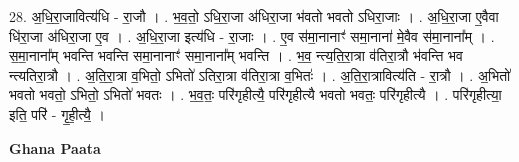 \documentclass[17pt]{extarticle}
\begin{document}
28. अ॒धि॒रा॒जावित्य॑धि - रा॒जौ । . भ॒व॒तो॒ ऽधि॒रा॒जा अ॑धिरा॒जा भ॑वतो भवतो ऽधिरा॒जाः । . अ॒धि॒रा॒जा ए॒वैवा धि॑रा॒जा अ॑धिरा॒जा ए॒व । . अ॒धि॒रा॒जा इत्य॑धि - रा॒जाः । . ए॒व स॑मा॒नानाꣳ॑ समा॒नाना॑ मे॒वैव स॑मा॒नाना᳚म् । . स॒मा॒नाना᳚म् भवन्ति भवन्ति समा॒नानाꣳ॑ समा॒नाना᳚म् भवन्ति । . भ॒व॒ न्त्य॒ति॒रा॒त्रा व॑तिरा॒त्रौ भ॑वन्ति भव न्त्यतिरा॒त्रौ । . अ॒ति॒रा॒त्रा व॒भितो॒ ऽभितो॑ ऽतिरा॒त्रा व॑तिरा॒त्रा व॒भितः॑ । . अ॒ति॒रा॒त्रावित्य॑ति - रा॒त्रौ । . अ॒भितो॑ भवतो भवतो॒ ऽभितो॒ ऽभितो॑ भवतः । . भ॒व॒तः॒ परि॑गृहीत्यै॒ परि॑गृहीत्यै भवतो भवतः॒ परि॑गृहीत्यै । . परि॑गृहीत्या॒ इति॒ परि॑ - गृ॒ही॒त्यै॒ । \newline

\textbf{Ghana Paata } \newline
\end{document}
